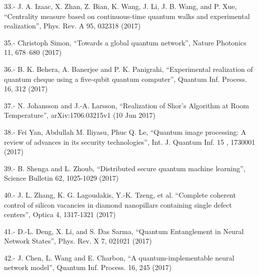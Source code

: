 33.- J. A. Izaac, X. Zhan, Z. Bian, K. Wang, J. Li, J. B. Wang, and P. Xue, “Centrality measure based on continuous-time quantum walks and experimental realization”, Phys. Rev. A 95, 032318 (2017)


35.- Christoph Simon, “Towards a global quantum network”, Nature Photonics 11, 678–680 (2017)

36.- B. K. Behera, A. Banerjee and P. K. Panigrahi, “Experimental realization of quantum cheque using a five-qubit quantum computer”, Quantum Inf. Process. 16, 312 (2017)

37.- N. Johansson and J.-A. Larsson, “Realization of Shor’s Algorithm at Room Temperature”, arXiv:1706.03215v1 (10 Jun 2017)

38.- Fei Yan, Abdullah M. Iliyasu, Phuc Q. Le, “Quantum image processing: A review of advances in its security technologies”, Int. J. Quantum Inf. 15 , 1730001 (2017)

39.- B. Shenga and L. Zhoub, “Distributed secure quantum machine learning”, Science Bulletin 62, 1025-1029 (2017)

40.- J. L. Zhang, K. G. Lagoudakis, Y.-K. Tzeng, et al. “Complete coherent control of silicon vacancies in diamond nanopillars containing single defect centers”, Optica 4, 1317-1321 (2017)

41.- D.-L. Deng, X. Li, and S. Das Sarma, “Quantum Entanglement in Neural Network States”, Phys.  Rev. X 7, 021021 (2017)

42.- J. Chen, L. Wang and E. Charbon, “A quantum-implementable neural network model”, Quantum Inf. Process. 16, 245 (2017)

